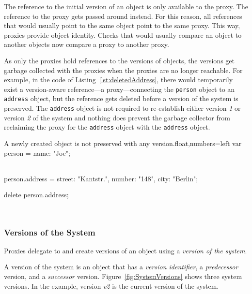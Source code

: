 The reference to the initial version of an object is only available to the proxy.
The reference to the proxy gets passed around instead.
For this reason, all references that would usually point to the same object point to the same proxy.
This way, proxies provide object identity.
Checks that would usually compare an object to another objects now compare a proxy to another proxy.

As only the proxies hold references to the versions of objects, the versions get garbage collected with the proxies when the proxies are no longer reachable.
For example, in the code of Listing~\ref{lst:deletedAddress}, there would temporarily exist a version-aware reference---a proxy---connecting the \lstinline{person} object to an \lstinline{address} object, but the reference gets deleted before a version of the system is preserved.
The \lstinline{address} object is not required to re-establish either version \emph{1} or version \emph{2} of the system and nothing does prevent the garbage collector from reclaiming the proxy for the \lstinline{address} object with the \lstinline{address} object.

\begin{code}{A newly created object is not preserved with any version.}{float,numbers=left}
    var person = {name: "Joe"};
    
    \\ [preserve first version]
    
    person.address = {street: "Kantstr.",
                      number: "148",
                      city: "Berlin"};
    
    delete person.address;
    
    \\ [preserve second version]
\end{code}
\iffalse
\end{verbatim}\fi


\subsubsection{Versions of the System}

Proxies delegate to and create versions of an object using a \emph{version of the system}.

A version of the system is an object that has a \emph{version identifier}, a \emph{predecessor} version, and a \emph{successor} version.
Figure~\ref{fig:SystemVersions} shows three system versions.
In the example, version \emph{v2} is the current version of the system.

